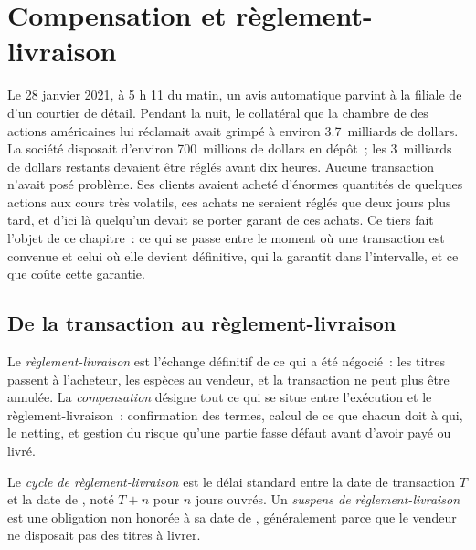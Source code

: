 \chapter{Compensation et règlement-livraison}\label{ch:m1:clearing-and-settlement}

Le 28 janvier 2021, à 5 h 11 du matin, un avis automatique parvint
à la filiale de  d'un courtier de détail. Pendant la nuit, le collatéral que
la chambre de  des actions américaines lui réclamait avait grimpé à environ 3.7~milliards de dollars. La société
disposait d'environ 700~millions de dollars en dépôt~; les 3~milliards de dollars restants devaient
être réglés avant dix heures. Aucune transaction n'avait posé problème. Ses clients avaient acheté
d'énormes quantités de quelques actions aux cours très volatils, ces achats ne
seraient réglés que deux jours plus tard, et d'ici là quelqu'un devait
se porter garant de ces achats. Ce tiers fait l'objet de ce chapitre~: ce qui se passe
entre le moment où une transaction est convenue et celui où elle devient définitive, qui
la garantit dans l'intervalle, et ce que coûte cette garantie.

\section{De la transaction au règlement-livraison}

\begin{definition}\label{def:m1:clearing-and-settlement:clearing}
Le \emph{règlement-livraison} est l'échange définitif de ce qui a été négocié~:
les titres passent à l'acheteur, les espèces au vendeur, et la transaction ne peut plus
être annulée. La \emph{compensation} désigne tout ce qui se situe entre l'exécution
et le règlement-livraison~: confirmation des termes, calcul de ce que chacun doit à qui,
le netting, et gestion du risque qu'une partie fasse défaut avant d'avoir payé ou
livré.
\end{definition}

\begin{definition}\label{def:m1:clearing-and-settlement:cycle}
Le \emph{cycle de règlement-livraison} est le délai standard
entre la date de transaction $T$ et la date de , noté $T{+}n$ pour $n$ jours
ouvrés. Un \emph{suspens de règlement-livraison} est une obligation non
honorée à sa date de , généralement parce que le vendeur ne disposait pas des
titres à livrer.
\end{definition}

